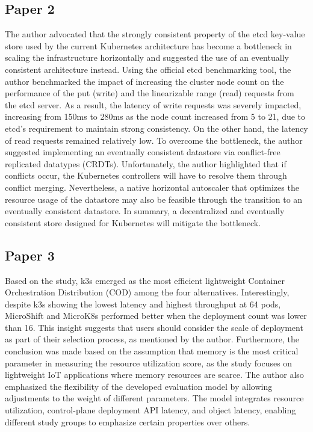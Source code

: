 \subsection{Paper 2}%
\label{sub:Paper 2}
The author advocated that the strongly consistent property of the etcd key-value store used by the current Kubernetes architecture has become a bottleneck in scaling the infrastructure horizontally and suggested the use of an eventually consistent architecture instead.  
Using the official etcd benchmarking tool, the author benchmarked the impact of increasing the cluster node count on the performance of the put (write) and the linearizable range (read) requests from the etcd server.  
As a result, the latency of write requests was severely impacted, increasing from 150ms to 280ms as the node count increased from 5 to 21, due to etcd's requirement to maintain strong consistency.  
On the other hand, the latency of read requests remained relatively low.  
To overcome the bottleneck, the author suggested implementing an eventually consistent datastore via conflict-free replicated datatypes (CRDTs).  
Unfortunately, the author highlighted that if conflicts occur, the Kubernetes controllers will have to resolve them through conflict merging.  
Nevertheless, a native horizontal autoscaler that optimizes the resource usage of the datastore may also be feasible through the transition to an eventually consistent datastore.  
In summary, a decentralized and eventually consistent store designed for Kubernetes will mitigate the bottleneck.  











\subsection{Paper 3}%
\label{sub:Paper 3}
Based on the study, k3s emerged as the most efficient lightweight Container Orchestration Distribution (COD) among the four alternatives.  
Interestingly, despite k3s showing the lowest latency and highest throughput at 64 pods, MicroShift and MicroK8s performed better when the deployment count was lower than 16.  
This insight suggests that users should consider the scale of deployment as part of their selection process, as mentioned by the author.  
Furthermore, the conclusion was made based on the assumption that memory is the most critical parameter in measuring the resource utilization score, as the study focuses on lightweight IoT applications where memory resources are scarce.  
The author also emphasized the flexibility of the developed evaluation model by allowing adjustments to the weight of different parameters.  
The model integrates resource utilization, control-plane deployment API latency, and object latency, enabling different study groups to emphasize certain properties over others.  
